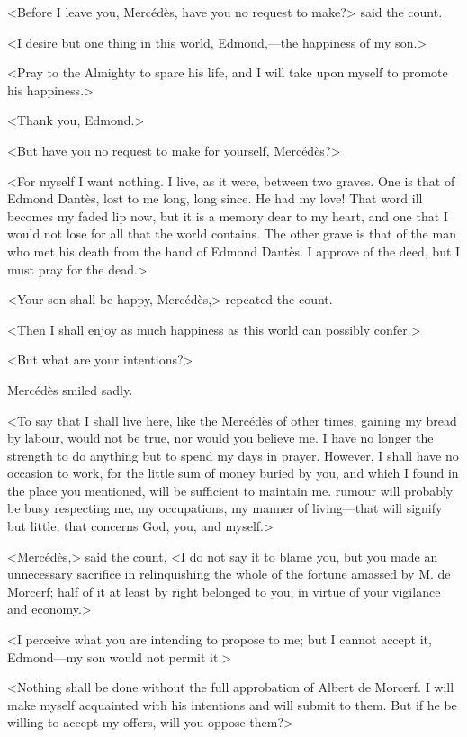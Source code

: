  <Before I leave you, Mercédès, have you no request to make?> said the count. 

 <I desire but one thing in this world, Edmond,—the happiness of my son.> 

 <Pray to the Almighty to spare his life, and I will take upon myself to promote his happiness.> 

 <Thank you, Edmond.> 

 <But have you no request to make for yourself, Mercédès?> 

 <For myself I want nothing. I live, as it were, between two graves. One is that of Edmond Dantès, lost to me long, long since. He had my love! That word ill becomes my faded lip now, but it is a memory dear to my heart, and one that I would not lose for all that the world contains. The other grave is that of the man who met his death from the hand of Edmond Dantès. I approve of the deed, but I must pray for the dead.> 

 <Your son shall be happy, Mercédès,> repeated the count. 

 <Then I shall enjoy as much happiness as this world can possibly confer.> 

 <But what are your intentions?> 

 Mercédès smiled sadly. 

 <To say that I shall live here, like the Mercédès of other times, gaining my bread by labour, would not be true, nor would you believe me. I have no longer the strength to do anything but to spend my days in prayer. However, I shall have no occasion to work, for the little sum of money buried by you, and which I found in the place you mentioned, will be sufficient to maintain me. rumour will probably be busy respecting me, my occupations, my manner of living—that will signify but little, that concerns God, you, and myself.> 

 <Mercédès,> said the count, <I do not say it to blame you, but you made an unnecessary sacrifice in relinquishing the whole of the fortune amassed by M. de Morcerf; half of it at least by right belonged to you, in virtue of your vigilance and economy.> 

 <I perceive what you are intending to propose to me; but I cannot accept it, Edmond—my son would not permit it.> 

 <Nothing shall be done without the full approbation of Albert de Morcerf. I will make myself acquainted with his intentions and will submit to them. But if he be willing to accept my offers, will you oppose them?> 

